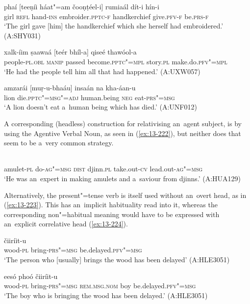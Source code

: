 \begin{exe}
\ex
\label{ex:13-219}
\gll phaí [teeṇíi háat"=am čooṇṭéel-i] rumiaál dít-i  hín-i \\
girl \textsc{refl} hand-\textsc{ins} embroider.\textsc{pptc-f} handkerchief give.\textsc{pfv-f} be.\textsc{prs-f} \\
\glt `The girl gave [him] the handkerchief which she herself had embroidered.' (A:SHY031)

\ex
\label{ex:13-220}
\gll xalk-íim ṣaawaá [teér bhíl-a] qiseé  thawóol-a \\
people-\textsc{pl.obl} \textsc{manip} passed become.\textsc{pptc"=mpl} story.\textsc{pl} make.do.\textsc{pfv"=mpl} \\
\glt `He had the people tell him all that had happened.' (A:UXW057)

\ex
\label{ex:13-221}
\gll amzarái [muṛ-u-bhaáu] insaán na  kha-áan-u \\
lion die.\textsc{pptc"=msg"=adj} human.being \textsc{neg} eat-\textsc{prs"=msg} \\
\glt `A lion doesn't eat a~human being which has died.' (A:UNF012) 
\end{exe}

A corresponding (headless) construction for relativising an~agent subject, is by using the Agentive Verbal Noun, as seen in (\ref{ex:13-222}), but neither does that seem to be a~very common strategy. 

\begin{exe}
\ex
\label{ex:13-222}
 \\
amulet-\textsc{pl} do-\textsc{ag"=msg} \textsc{dist} djinn.\textsc{pl} take.out-\textsc{cv} lead.out-\textsc{ag"=msg} \\
\glt `He was an~expert in making amulets and a~saviour from djinns.' (A:HUA129) 
\end{exe}

Alternatively, the present"=tense verb is itself used without an~overt head, as in (\ref{ex:13-223}). This has an~implicit habituality read into it, whereas the corresponding non"=habitual meaning would have to be expressed with an~explicit correlative head (\ref{ex:13-224}).

\begin{exe}
\ex
\label{ex:13-223}
 čiiríit-u  \\
wood-\textsc{pl} bring-\textsc{prs"=msg} be.delayed.\textsc{pfv"=msg} \\
\glt `The person who [usually] brings the wood has been delayed' (A:HLE3051)

\ex
\label{ex:13-224}
 eesó phoó čiiríit-u  \\
wood-\textsc{pl} bring-\textsc{prs"=msg} \textsc{rem.ms}\textsc{g.}\textsc{nom} boy be.delayed.\textsc{pfv"=msg}  \\
\glt `The boy who is bringing the wood has been delayed.' (A:HLE3051)
\end{exe}

